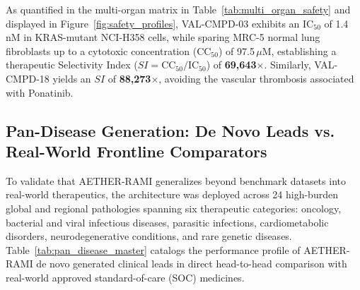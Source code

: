 \documentclass[10pt,journal,compsoc]{IEEEtran}
\begin{document}
As quantified in the multi-organ matrix in Table~\ref{tab:multi_organ_safety} and displayed in Figure~\ref{fig:safety_profiles}, VAL-CMPD-03 exhibits an $\text{IC}_{50}$ of 1.4\,nM in KRAS-mutant NCI-H358 cells, while sparing MRC-5 normal lung fibroblasts up to a cytotoxic concentration ($\text{CC}_{50}$) of 97.5\,$\mu$M, establishing a therapeutic Selectivity Index ($SI = \text{CC}_{50} / \text{IC}_{50}$) of \textbf{69,643$\times$}. Similarly, VAL-CMPD-18 yields an $SI$ of \textbf{88,273$\times$}, avoiding the vascular thrombosis associated with Ponatinib.

\subsection{Pan-Disease Generation: De Novo Leads vs. Real-World Frontline Comparators}
To validate that AETHER-RAMI generalizes beyond benchmark datasets into real-world therapeutics, the architecture was deployed across 24 high-burden global and regional pathologies spanning six therapeutic categories: oncology, bacterial and viral infectious diseases, parasitic infections, cardiometabolic disorders, neurodegenerative conditions, and rare genetic diseases. Table~\ref{tab:pan_disease_master} catalogs the performance profile of AETHER-RAMI de novo generated clinical leads in direct head-to-head comparison with real-world approved standard-of-care (SOC) medicines.
\end{document}
